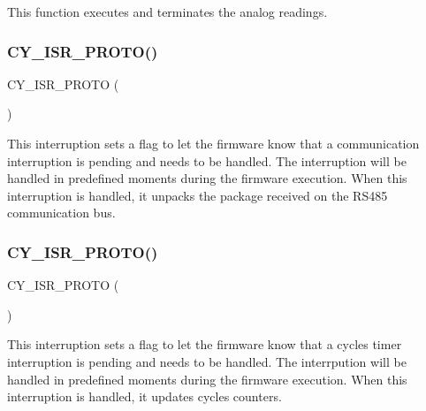 This function executes and terminates the analog readings. \mbox{\label{interruptions_8h_a7e24af8c83537b0441877bf0f00dd30a}} 
\subsubsection{C\+Y\+\_\+\+I\+S\+R\+\_\+\+P\+R\+O\+T\+O()\hspace{0.1cm}{\footnotesize\ttfamily [1/2]}}
{\footnotesize\ttfamily C\+Y\+\_\+\+I\+S\+R\+\_\+\+P\+R\+O\+TO (\begin{DoxyParamCaption}\item[{I\+S\+R\+\_\+\+R\+S485\+\_\+\+R\+X\+\_\+\+Ex\+Interrupt}]{ }\end{DoxyParamCaption})}

This interruption sets a flag to let the firmware know that a communication interruption is pending and needs to be handled. The interruption will be handled in predefined moments during the firmware execution. When this interruption is handled, it unpacks the package received on the R\+S485 communication bus. \mbox{\label{interruptions_8h_a4b74d7d608d07d4a230aaa9cd0c1a21a}} 
\subsubsection{C\+Y\+\_\+\+I\+S\+R\+\_\+\+P\+R\+O\+T\+O()\hspace{0.1cm}{\footnotesize\ttfamily [2/2]}}
{\footnotesize\ttfamily C\+Y\+\_\+\+I\+S\+R\+\_\+\+P\+R\+O\+TO (\begin{DoxyParamCaption}\item[{I\+S\+R\+\_\+\+C\+Y\+C\+L\+E\+S\+\_\+\+Handler}]{ }\end{DoxyParamCaption})}

This interruption sets a flag to let the firmware know that a cycles timer interruption is pending and needs to be handled. The interrpution will be handled in predefined moments during the firmware execution. When this interruption is handled, it updates cycles counters. \mbox{\label{interruptions_8h_a77877c16b42f6f384f7c80d3002aed22}} 
